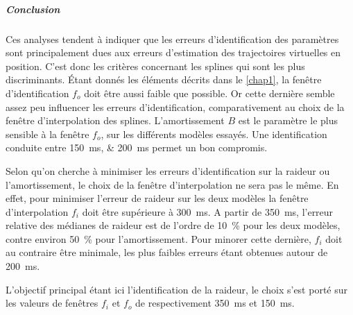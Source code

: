 
\tikzexternaldisable

\subparagraph{Conclusion}

Ces analyses tendent à indiquer que les erreurs d'identification des paramètres sont principalement dues aux erreurs d'estimation des trajectoires virtuelles en position. C'est donc les critères concernant les splines qui sont les plus discriminants. Étant donnés les éléments décrits dans le \cref{chap1}, la fenêtre d'identification $f_o$ doit être aussi faible que possible. Or cette dernière semble assez peu influencer les erreurs d'identification, comparativement au choix de la fenêtre d'interpolation des splines. L'amortissement $B$ est le paramètre le plus sensible à la fenêtre $f_o$, sur les différents modèles essayés. Une identification conduite entre \SIlist{150;200}{\milli\second} permet un bon compromis.

Selon qu'on cherche à minimiser les erreurs d'identification sur la raideur ou l'amortissement, le choix de la fenêtre d'interpolation ne sera pas le même. En effet, pour minimiser l'erreur de raideur sur les deux modèles la fenêtre d'interpolation $f_i$ doit être supérieure à \SI{300}{\milli\second}. A partir de \SI{350}{\milli\second}, l'erreur relative des médianes de raideur est de l'ordre de \SI{10}{\percent} pour les deux modèles, contre environ \SI{50}{\percent} pour l'amortissement. Pour minorer cette dernière, $f_i$ doit au contraire être minimale, les plus faibles erreurs étant obtenues autour de \SI{200}{\milli\second}.

L'objectif principal étant ici l'identification de la raideur, le choix s'est porté sur les valeurs de fenêtres $f_i$ et $f_o$ de respectivement \SI{350}{\milli\second} et \SI{150}{\milli\second}.



